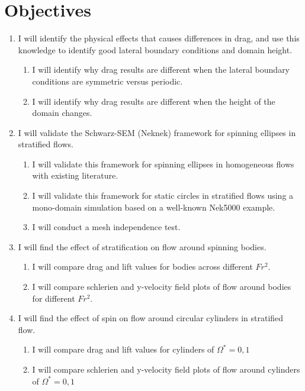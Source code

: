 %
%
%
%

\chapter{Objectives}
\label{chp:Objectives}

\begin{enumerate}
	\item I will identify the physical effects that causes differences in drag, and use this knowledge to identify good lateral boundary conditions and domain height.
	\begin{enumerate}
		\item I will identify why drag results are different when the lateral boundary conditions are symmetric versus periodic. 
		\item I will identify why drag results are different when the height of the domain changes. 
	\end{enumerate}
	\item I will validate the Schwarz-SEM (Neknek) framework for spinning ellipses in stratified flows.
	\begin{enumerate}
		\item I will validate this framework for spinning ellipses in homogeneous flows with existing literature.
		\item I will validate this framework for static circles in stratified flows using a mono-domain simulation based on a well-known Nek5000 example.
		\item I will conduct a mesh independence test.
	\end{enumerate}
	\item I will find the effect of stratification on flow around spinning bodies.
	\begin{enumerate}
		\item I will compare drag and lift values for bodies across different $Fr^2$.
		\item I will compare schlerien and y-velocity field plots of flow around bodies for different $Fr^2$.
	\end{enumerate}
	\item I will find the effect of spin on flow around circular cylinders in stratified flow.
	\begin{enumerate}
		\item I will compare drag and lift values for cylinders of $\Omega^{\ast} = 0, 1$ 
		\item I will compare schlerien and y-velocity field plots of flow around cylinders of $\Omega^{\ast} = 0, 1$ 
	\end{enumerate}
\end{enumerate}
